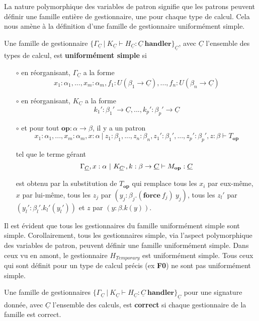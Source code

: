 La nature polymorphique des variables de patron signifie que les patrons peuvent définir une famille entière de gestionnaire, une pour chaque type de calcul. Cela nous amène à la définition d'une famille de gestionnaire uniformément simple.

\begin{definition}
	Une famille de gestionnaire $\{\Gamma_{\underline{C}}~|~K_{\underline{C}} \vdash H_{\underline{C}}:\underline{C}~\textbf{handler}\}_{\underline{C}}$, avec $\underline{C}$ l'ensemble des types de calcul, est \textbf{uniformément simple} si
	
	\begin{enumerate}
		\item[$\circ$] en réorganisant, $\Gamma_{\underline{C}}$ a la forme 
		\[x_1:\alpha_1,...,x_m:\alpha_m,f_1:U(\beta_1 \rightarrow \underline{C}),...,f_n:U(\beta_n \rightarrow \underline{C})\]
		
		\item[$\circ$] en réorganisant, $K_{\underline{C}}$ a la forme
		\[k_1':\beta_1' \rightarrow \underline{C},...,k_p':\beta_p' \rightarrow \underline{C}\]
		
		\item[$\circ$] et pour tout $\textbf{op}: \alpha \rightarrow \beta$, il y a un patron
		\[x_1:\alpha_1,...,x_m:\alpha_m,x:\alpha~|~z_1:\beta_1,...,z_n:\beta_n,z_1':\beta_1',...,z_p':\beta_p',z:\beta \vdash T_\textbf{op}\]
		
		tel que le terme gérant 
		\[\Gamma_{\underline{C}},x:\alpha~|~K_{\underline{C}`},k:\beta \rightarrow \underline{C} \vdash M_\textbf{op}:\underline{C}\]
		
		est obtenu par la substitution de $T_\textbf{op}$ qui remplace tous les $x_i$ par eux-même, $x$ par lui-même, tous les $z_j$ par $(y_j:\beta_j.(\textbf{force}~f_j)~y_j)$, tous les $z_l'$ par $(y_l':\beta_l'.k_l'(y_l'))$ et $z$ par $(y:\beta.k(y))$.
	\end{enumerate}
\end{definition}

Il est évident que tous les gestionnaires du famille uniformément simple sont simple. Corollairement, tous les gestionnaires simple, via l'aspect polymorphique des variables de patron, peuvent définir une famille uniformément simple. Dans ceux vu en amont, le gestionnaire $H_{Temporary}$ est uniformément simple. Tous ceux qui sont définit pour un type de calcul précis (ex \textbf{F0}) ne sont pas uniformément simple.

\begin{definition}
	Une famille de gestionnaires $\{\Gamma_{\underline{C}}~|~K_{\underline{C}} \vdash H_{\underline{C}}:\underline{C}~\textbf{handler}\}_{\underline{C}}$ pour une signature donnée, avec $\underline{C}$ l'ensemble des calculs, est \textbf{correct} si chaque gestionnaire de la famille est correct.
\end{definition}

